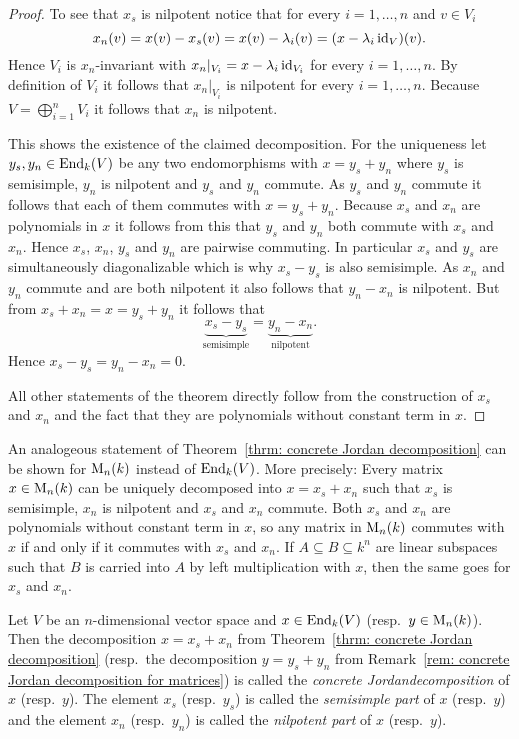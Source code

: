 \begin{proof}
 To see that $x_s$ is nilpotent notice that for every $i = 1, \dotsc, n$ and $v \in V_i$
 \[
  x_n(v) = x(v) - x_s(v) = x(v) - \lambda_i (v) = (x - \lambda_i \operatorname{id}_V)(v).
 \]
 Hence $V_i$ is $x_n$-invariant with $x_n|_{V_i} = x - \lambda_i \operatorname{id}_{V_i}$ for every $i = 1, \dotsc, n$. By definition of $V_i$ it follows that $x_n|_{V_i}$ is nilpotent for every $i = 1, \dotsc, n$. Because $V = \bigoplus_{i=1}^n V_i$ it follows that $x_n$ is nilpotent.
 
 This shows the existence of the claimed decomposition. For the uniqueness let $y_s, y_n \in \operatorname{End}_k(V)$ be any two endomorphisms with $x = y_s + y_n$ where $y_s$ is semisimple, $y_n$ is nilpotent and $y_s$ and $y_n$ commute. As $y_s$ and $y_n$ commute it follows that each of them commutes with $x = y_s + y_n$. Because $x_s$ and $x_n$ are polynomials in $x$ it follows from this that $y_s$ and $y_n$ both commute with $x_s$ and $x_n$. Hence $x_s$, $x_n$, $y_s$ and $y_n$ are pairwise commuting. In particular $x_s$ and $y_s$ are simultaneously diagonalizable which is why $x_s - y_s$ is also semisimple. As $x_n$ and $y_n$ commute and are both nilpotent it also follows that $y_n - x_n$ is nilpotent. But from $x_s + x_n = x = y_s + y_n$ it follows that
 \[
  \underbrace{x_s - y_s}_{\text{semisimple}} = \underbrace{y_n - x_n}_{\text{nilpotent}}.
 \]
 Hence $x_s - y_s = y_n - x_n = 0$.
 
 All other statements of the theorem directly follow from the construction of $x_s$ and $x_n$ and the fact that they are polynomials without constant term in $x$.
\end{proof}



\begin{rem}\label{rem: concrete Jordan decomposition for matrices}
 An analogeous statement of Theorem~\ref{thrm: concrete Jordan decomposition} can be shown for $\operatorname{M}_n(k)$ instead of $\operatorname{End}_k(V)$. More precisely: Every matrix $x \in \operatorname{M}_n(k)$ can be uniquely decomposed into $x = x_s + x_n$ such that $x_s$ is semisimple, $x_n$ is nilpotent and $x_s$ and $x_n$ commute. Both $x_s$ and $x_n$ are polynomials without constant term in $x$, so any matrix in $\operatorname{M}_n(k)$ commutes with $x$ if and only if it commutes with $x_s$ and $x_n$. If $A \subseteq B \subseteq k^n$ are linear subspaces such that $B$ is carried into $A$ by left multiplication with $x$, then the same goes for $x_s$ and $x_n$.
\end{rem}


\begin{defi}
 Let $V$ be an $n$-dimensional vector space and $x \in \operatorname{End}_k(V)$ (resp.\ $y \in \operatorname{M}_n(k)$). Then the decomposition $x = x_s + x_n$ from Theorem~\ref{thrm: concrete Jordan decomposition} (resp.\ the decomposition $y = y_s + y_n$ from Remark~\ref{rem: concrete Jordan decomposition for matrices}) is called the \emph{concrete Jordandecomposition} of $x$ (resp.\ $y$). The element $x_s$ (resp.\ $y_s$) is called the \emph{semisimple part} of $x$ (resp.\ $y$) and the element $x_n$ (resp.\ $y_n$) is called the \emph{nilpotent part} of $x$ (resp.\ $y$).
\end{defi}


